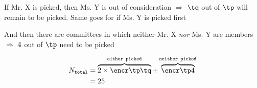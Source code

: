 
\watchout[-30pt]

\ifprintanswers
\fi 

\begin{solution}[\mcq]
	If Mr. X is picked, then Ms. Y is out of consideration $\Rightarrow$ $\tq$ out of $\tp$ 
	will remain to be picked. Same goes for if Ms. Y is picked first

  And then there are committees in which neither Mr. X \textit{nor} Ms. Y are members $\Rightarrow$ 
  $4$ out of $\tp$ need to be picked
	
	\begin{align}
		N_{\texttt{total}} &= \overbrace{2\times\encr\tp\tq}^{\texttt{either picked}} + 
    \overbrace{\encr\tp\vbone}^{\texttt{neither picked}} \\
		&= \vbthree
	\end{align}
\end{solution}
